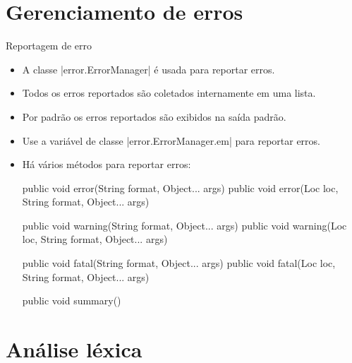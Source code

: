 \section{Gerenciamento de erros}

\begin{frame}{Reportagem de erro}
  \begin{itemize}
    \item A classe \pyginline|error.ErrorManager| é usada para
    reportar erros.
    \item Todos os erros reportados são coletados internamente em uma
    lista.
    \item Por padrão os erros reportados são exibidos na saída padrão.
    \item Use a variável de classe \pyginline|error.ErrorManager.em|
    para reportar erros.
    \item Há vários métodos para reportar erros:
\begin{pygmented}[]
   public void error(String format, Object... args)
   public void error(Loc loc, String format, Object... args)

   public void warning(String format, Object... args)
   public void warning(Loc loc, String format, Object... args)

   public void fatal(String format, Object... args)
   public void fatal(Loc loc, String format, Object... args)

   public void summary()
\end{pygmented}
  \end{itemize}
\end{frame}


\section{Análise léxica}

